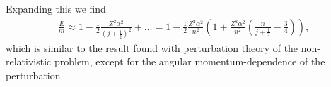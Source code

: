 Expanding this we find
\begin{align*}
	\frac{E}{m} \approx 1 - \frac{1}{2}\frac{Z^{2}\alpha^{2}}{\left(j + \frac{1}{2}\right)^{2}} + \dots = 1 - \frac{1}{2}\frac{Z^{2}\alpha^{2}}{n^{2}}\left(1 + \frac{Z^{2}\alpha^{2}}{n^{2}}\left(\frac{n}{j + \frac{1}{2}} - \frac{3}{4}\right)\right),
\end{align*}
which is similar to the result found with perturbation theory of the non-relativistic problem, except for the angular momentum-dependence of the perturbation.